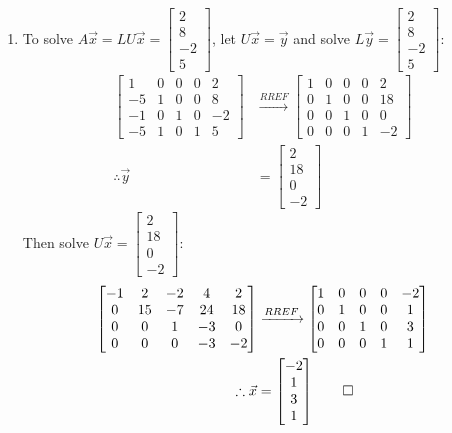 \documentclass[12pt, a4paper]{article}
\begin{document}
\begin{enumerate}[Q\arabic*.]
\begin{enumerate}[(\alph*)]
    \item To solve $A \vec{x} = LU \vec{x} = \begin{bmatrix}2\\8\\-2\\5\end{bmatrix}$, let $U \vec{x} = \vec{y}$ and solve $L \vec{y} = \begin{bmatrix}2\\8\\-2\\5\end{bmatrix}$:
      \begin{align*}
        \begin{bmatrix}
          1&0&0&0&2\\
          -5&1&0&0&8\\
          -1&0&1&0&-2\\
          -5&1&0&1&5
        \end{bmatrix} &\xrightarrow{RREF}
        \begin{bmatrix}
          1&0&0&0&2\\
          0&1&0&0&18\\
          0&0&1&0&0\\
          0&0&0&1&-2
        \end{bmatrix}\\
        \therefore \vec{y} &= \begin{bmatrix}2\\18\\0\\-2\end{bmatrix}
      \end{align*}
      Then solve $U \vec{x} =  \begin{bmatrix}2\\18\\0\\-2\end{bmatrix}$:
      \begin{align*}
        \begin{bmatrix}
          -1&2&-2&4&2\\
          0&15&-7&24&18\\
          0&0&1&-3&0\\
          0&0&0&-3&-2
        \end{bmatrix} &\xrightarrow{RREF}
        \begin{bmatrix}
          1&0&0&0&-2\\
          0&1&0&0&1\\
          0&0&1&0&3\\
          0&0&0&1&1
        \end{bmatrix}\\
        \therefore \vec{x} &= \begin{bmatrix}-2\\1\\3\\1\end{bmatrix}\qed
      \end{align*}


\end{enumerate}
\end{enumerate}
\end{document}
